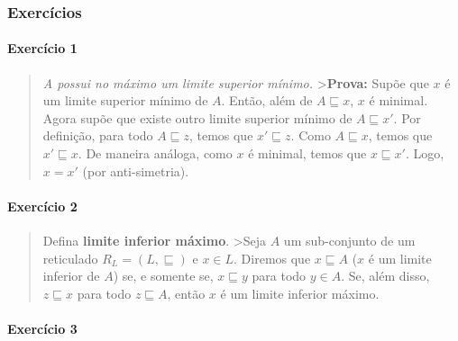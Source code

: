 \hypertarget{exercuxedcios}{%
\subsubsection{Exercícios}\label{exercuxedcios}}

\hypertarget{exercuxedcio-1}{%
\paragraph{Exercício 1}\label{exercuxedcio-1}}

\begin{quote}
\emph{A possui no máximo um limite superior mínimo.}
\textgreater{}\textbf{Prova:} Supõe que \(x\) é um limite superior
mínimo de \(A\). Então, além de \(A \sqsubseteq x\), \(x\) é minimal.
Agora supõe que existe outro limite superior mínimo de
\(A \sqsubseteq x'\). Por definição, para todo \(A \sqsubseteq z\),
temos que \(x' \sqsubseteq z\). Como \(A \sqsubseteq x\), temos que
\(x' \sqsubseteq x\). De maneira análoga, como \(x\) é minimal, temos
que \(x \sqsubseteq x'\). Logo, \(x = x'\) (por anti-simetria).
\end{quote}

\hypertarget{exercuxedcio-2}{%
\paragraph{Exercício 2}\label{exercuxedcio-2}}

\begin{quote}
Defina \textbf{limite inferior máximo}. \textgreater Seja \(A\) um
sub-conjunto de um reticulado \(R_L = (L, \sqsubseteq)\) e \(x \in L\).
Diremos que \(x \sqsubseteq A\) (\(x\) é um limite inferior de \(A\))
se, e somente se, \(x \sqsubseteq y\) para todo \(y \in A\). Se, além
disso, \(z \sqsubseteq x\) para todo \(z \sqsubseteq A\), então \(x\) é
um limite inferior máximo.
\end{quote}

\hypertarget{exercuxedcio-3}{%
\paragraph{Exercício 3}\label{exercuxedcio-3}}

